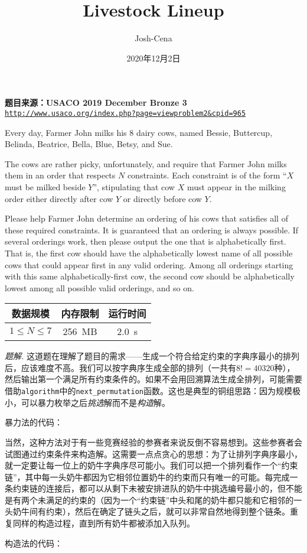 \documentclass[UTF8,12pt]{ctexart}
\title{Livestock Lineup}
\author{Josh-Cena}
\date{2020年12月2日}
\begin{document}
\maketitle
\begin{mdframed}[style=Question]
    \textbf{题目来源：USACO 2019 December Bronze 3}\\\texttt{\url{http://www.usaco.org/index.php?page=viewproblem2&cpid=965}}

    Every day, Farmer John milks his 8 dairy cows, named Bessie, Buttercup, Belinda, Beatrice, Bella, Blue, Betsy, and Sue.

    The cows are rather picky, unfortunately, and require that Farmer John milks them in an order that respects $N$ constraints. Each constraint is of the form ``$X$ must be milked beside $Y$'', stipulating that cow $X$ must appear in the milking order either directly after cow $Y$ or directly before cow $Y$.

    Please help Farmer John determine an ordering of his cows that satisfies all of these required constraints. It is guaranteed that an ordering is always possible. If several orderings work, then please output the one that is alphabetically first. That is, the first cow should have the alphabetically lowest name of all possible cows that could appear first in any valid ordering. Among all orderings starting with this same alphabetically-first cow, the second cow should be alphabetically lowest among all possible valid orderings, and so on.

    \begin{table}[H]
        \centering
        \begin{tabular}{|c|c|c|}\hline
            数据规模&内存限制&运行时间\\\hline
            $1\le N\le 7$&\SI{256}{MB}&\SI{2.0}{s}\\\hline
        \end{tabular}
    \end{table}
\end{mdframed}
\textit{题解.} 这道题在理解了题目的需求——生成一个符合给定约束的字典序最小的排列后，应该难度不高。我们可以按字典序生成全部的排列（一共有$8!=40320$种），然后输出第一个满足所有约束条件的。如果不会用回溯算法生成全排列，可能需要借助\texttt{algorithm}中的\texttt{next\_permutation}函数。这也是典型的铜组思路：因为规模极小，可以暴力枚举之后\textit{挑选}解而不是\textit{构造}解。

暴力法的代码：



当然，这种方法对于有一些竞赛经验的参赛者来说反倒不容易想到。这些参赛者会试图通过约束条件来构造解。这需要一点点贪心的思想：为了让排列字典序最小，就一定要让每一位上的奶牛字典序尽可能小。我们可以把一个排列看作一个“约束链”，其中每一头奶牛都因为它相邻位置奶牛的约束而只有唯一的可能。每完成一条约束链的连接后，都可以从剩下未被安排进队的奶牛中挑选编号最小的，但不能是有两个未满足的约束的（因为一个“约束链”中头和尾的奶牛都只能和它相邻的一头奶牛间有约束），然后在确定了链头之后，就可以非常自然地得到整个链条。重复同样的构造过程，直到所有奶牛都被添加入队列。

构造法的代码：


\end{document}
